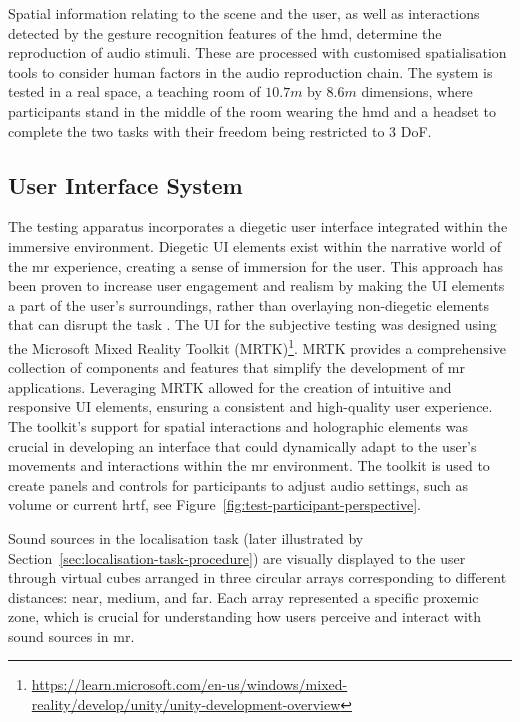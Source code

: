 Spatial information relating to the scene and the user, as well as interactions detected by the gesture recognition features of the \acrshort{hmd}, determine the reproduction of audio stimuli. These are processed with customised spatialisation tools to consider human factors in the audio reproduction chain. The system is tested in a real space, a teaching room of $10.7m$ by $8.6m$ dimensions, where participants stand in the middle of the room wearing the \acrshort{hmd} and a headset to complete the two tasks with their freedom being restricted to 3 DoF.\par

\subsection{User Interface System}
The testing apparatus incorporates a diegetic user interface integrated within the immersive environment. Diegetic UI elements exist within the narrative world of the \acrshort{mr} experience, creating a sense of immersion for the user. This approach has been proven to increase user engagement and realism by making the UI elements a part of the user's surroundings, rather than overlaying non-diegetic elements that can disrupt the task \citep{dickinson2021diegetic}.
The UI for the subjective testing was designed using the Microsoft Mixed Reality Toolkit (MRTK)\footnote{\url{https://learn.microsoft.com/en-us/windows/mixed-reality/develop/unity/unity-development-overview}}. MRTK provides a comprehensive collection of components and features that simplify the development of \acrshort{mr} applications. Leveraging MRTK allowed for the creation of intuitive and responsive UI elements, ensuring a consistent and high-quality user experience. The toolkit's support for spatial interactions and holographic elements was crucial in developing an interface that could dynamically adapt to the user's movements and interactions within the \acrshort{mr} environment. The toolkit is used to create panels and controls for participants to adjust audio settings, such as volume or current \acrshort{hrtf}, see Figure~\ref{fig:test-participant-perspective}.\par
Sound sources in the localisation task (later illustrated by Section~\ref{sec:localisation-task-procedure}) are visually displayed to the user through virtual cubes arranged in three circular arrays corresponding to different distances: near, medium, and far. Each array represented a specific proxemic zone, which is crucial for understanding how users perceive and interact with sound sources in \acrshort{mr}. 
